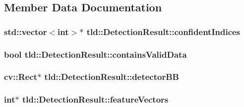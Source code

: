 \subsection{Member Data Documentation}
\hypertarget{classtld_1_1_detection_result_aae986474ad532795e262e240a3ddb951}{
\subsubsection[{confidentIndices}]{\setlength{\rightskip}{0pt plus 5cm}std::vector$<$int$>$$\ast$ {\bf tld::DetectionResult::confidentIndices}}}
\label{classtld_1_1_detection_result_aae986474ad532795e262e240a3ddb951}
\hypertarget{classtld_1_1_detection_result_af5202404b0b269bd5f8c6b483356c517}{
\subsubsection[{containsValidData}]{\setlength{\rightskip}{0pt plus 5cm}bool {\bf tld::DetectionResult::containsValidData}}}
\label{classtld_1_1_detection_result_af5202404b0b269bd5f8c6b483356c517}
\hypertarget{classtld_1_1_detection_result_ab3cade119a99e868902e6bca2e6271df}{
\subsubsection[{detectorBB}]{\setlength{\rightskip}{0pt plus 5cm}cv::Rect$\ast$ {\bf tld::DetectionResult::detectorBB}}}
\label{classtld_1_1_detection_result_ab3cade119a99e868902e6bca2e6271df}
\hypertarget{classtld_1_1_detection_result_a2650bfbdb106c7dd9b774cfccf5fdb25}{
\subsubsection[{featureVectors}]{\setlength{\rightskip}{0pt plus 5cm}int$\ast$ {\bf tld::DetectionResult::featureVectors}}}
\label{classtld_1_1_detection_result_a2650bfbdb106c7dd9b774cfccf5fdb25}
